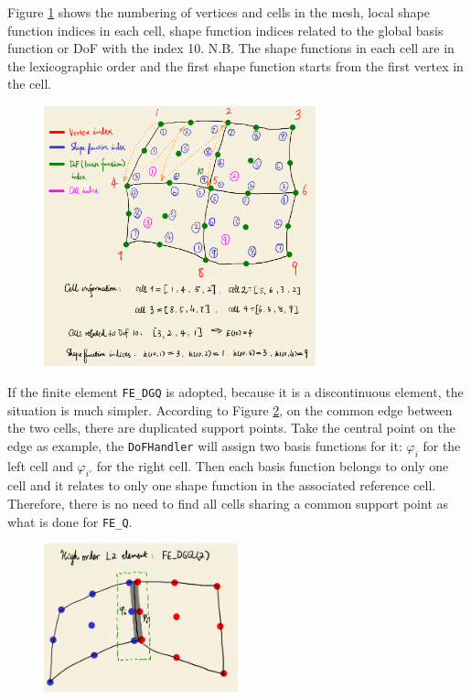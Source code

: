 \documentclass[11pt, a4paper]{book}
\begin{document}
Figure \ref{fig:local-shape-function-and-global-dof} shows the numbering of vertices and
cells in the mesh, local shape function indices in each cell, shape function indices
related to the global basis function or DoF with the index 10. N.B. The shape functions in
each cell are in the lexicographic order and the first shape function starts from the
first vertex in the cell.
\begin{figure}[htbp]
  \centering
  \includegraphics[width=0.7\textwidth, height=\textheight, keepaspectratio]{figures/shape-function-index-and-global-dof-index-draft}
  \caption{}
  \label{fig:local-shape-function-and-global-dof}
\end{figure}
If the finite element \texttt{FE\_DGQ} is adopted, because it is a discontinuous element,
the situation is much simpler. According to Figure \ref{fig:fe-dgq-2nd-order}, on the
common edge between the two cells, there are duplicated support points. Take the central
point on the edge as example, the \texttt{DoFHandler} will assign two basis functions for
it: $\varphi_i$ for the left cell and $\varphi_{i'}$ for the right cell. Then each basis
function belongs to only one cell and it relates to only one shape function in the
associated reference cell. Therefore, there is no need to find all
cells sharing a common support point as what is done for \texttt{FE\_Q}.
\begin{figure}[htbp]
  \centering
  \includegraphics[width=0.5\textwidth, height=\textheight, keepaspectratio]{figures/fe-dgq-2nd-order}
  \caption{}
  \label{fig:fe-dgq-2nd-order}
\end{figure}
\end{document}
